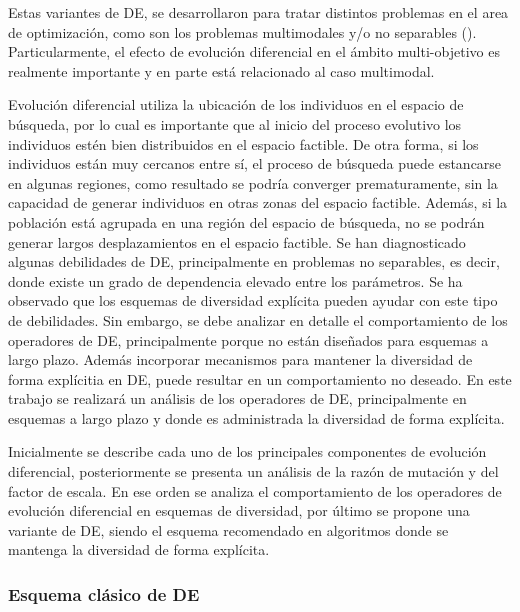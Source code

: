 %
Estas variantes de DE, se desarrollaron para tratar distintos problemas en el area de optimización, como son los problemas multimodales y/o no separables (\cite{kukkonen2009performance}).
%
Particularmente, el efecto de evolución diferencial en el ámbito multi-objetivo es realmente importante y en parte está relacionado al caso multimodal.
%


Evolución diferencial utiliza la ubicación de los individuos en el espacio de búsqueda, por lo cual es importante que al inicio del proceso evolutivo los individuos estén bien distribuidos en el espacio factible.
%
De otra forma, si los individuos están muy cercanos entre sí, el proceso de búsqueda puede estancarse en algunas regiones, como resultado se podría converger prematuramente, sin la capacidad de generar individuos en otras zonas del espacio factible.
%
Además, si la población está agrupada en una región del espacio de búsqueda, no se podrán generar largos desplazamientos en el espacio factible.
%
Se han diagnosticado algunas debilidades de DE, principalmente en problemas no separables, es decir, donde existe un grado de dependencia elevado entre los parámetros.
%
Se ha observado que los esquemas de diversidad explícita pueden ayudar con este tipo de debilidades.
%
Sin embargo, se debe analizar en detalle el comportamiento de los operadores de DE, principalmente porque no están diseñados para esquemas a largo plazo.
%
Además incorporar mecanismos para mantener la diversidad de forma explícitia en DE, puede resultar en un comportamiento no deseado.
%
En este trabajo se realizará un análisis de los operadores de DE, principalmente en esquemas a largo plazo y donde es administrada la diversidad de forma explícita.
%

Inicialmente se describe cada uno de los principales componentes de evolución diferencial, posteriormente se presenta un análisis de la razón de mutación y del factor de escala.
%
En ese orden se analiza el comportamiento de los operadores de evolución diferencial en esquemas de diversidad, por último se propone una variante de DE, siendo el esquema recomendado en algoritmos donde se mantenga la diversidad de forma explícita.

\subsubsection{Esquema clásico de DE}

